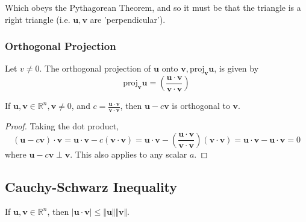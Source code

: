 \documentclass{article}
\begin{document}
\noindent Which obeys the Pythagorean Theorem, and so it must be that the triangle is a right triangle (i.e. $\bm{u}, \bm{v}$ are 'perpendicular').

\subsubsection{Orthogonal Projection}
\begin{theorem}
    Let $v \neq 0$. The orthogonal projection of $\bm{u}$ onto $\bm{v}, \text{proj}_{\bm{v}}\bm{u}$, is given by 
    \begin{equation*}
        \text{proj}_{\bm{v}}\bm{u} = \left(\frac{\bm{u} \cdot \bm{v}}{\bm{v} \cdot \bm{v}}\right)
    \end{equation*}
\end{theorem}

\begin{proposition}
    If $\bm{u}, \bm{v} \in \mathbb{R}^n, \bm{v} \neq 0$, and $c = \frac{\bm{u} \cdot \bm{v}}{\bm{v} \cdot \bm{v}}$, then $\bm{u} - c\bm{v}$ is orthogonal to $\bm{v}$.  
\end{proposition}

\begin{proof}\label{proof:scalarorthogonal}
    Taking the dot product, 
    \begin{equation*}
        (\bm{u} - c\bm{v}) \cdot \bm{v} = \bm{u} \cdot \bm{v} - c(\bm{v} \cdot \bm{v}) = \bm{u} \cdot \bm{v} - \left(\frac{\bm{u} \cdot \bm{v}}{\bm{v} \cdot \bm{v}}\right) (\bm{v} \cdot \bm{v}) = \bm{u} \cdot \bm{v} - \bm{u} \cdot \bm{v} = 0
    \end{equation*}
    \noindent where $\bm{u} - c\bm{v} \perp \bm{v}$. This also applies to any scalar $a$. 
\end{proof}

\subsection{Cauchy-Schwarz Inequality}

\begin{definition}
    If $\bm{u}, \bm{v} \in \mathbb{R}^n$, then $|\bm{u} \cdot \bm{v}| \leq \Vert \bm{u} \Vert \Vert \bm{v} \Vert$.
\end{definition}
\end{document}
